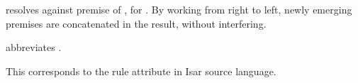 \begin{isabellebody}
\begin{isamarkuptext}
\begin{description}
  \item {} resolves 
  against premise  of , for .  By working from right to left, newly emerging premises are
  concatenated in the result, without interfering.

  \item {} abbreviates .

  This corresponds to the rule attribute \hyperlink{attribute.OF}{\mbox{}} in Isar
  source language.

  \end{description}%
\end{isamarkuptext}%
\isamarkuptrue%
%
\endisatagmlref
{\isafoldmlref}%
%
\isadelimmlref
%
\endisadelimmlref
%
\isadelimtheory
%
\endisadelimtheory
%
\isatagtheory
{}\isamarkupfalse%
%
\endisatagtheory
{\isafoldtheory}%
%
\isadelimtheory
%
\endisadelimtheory
\isanewline
\end{isabellebody}%
